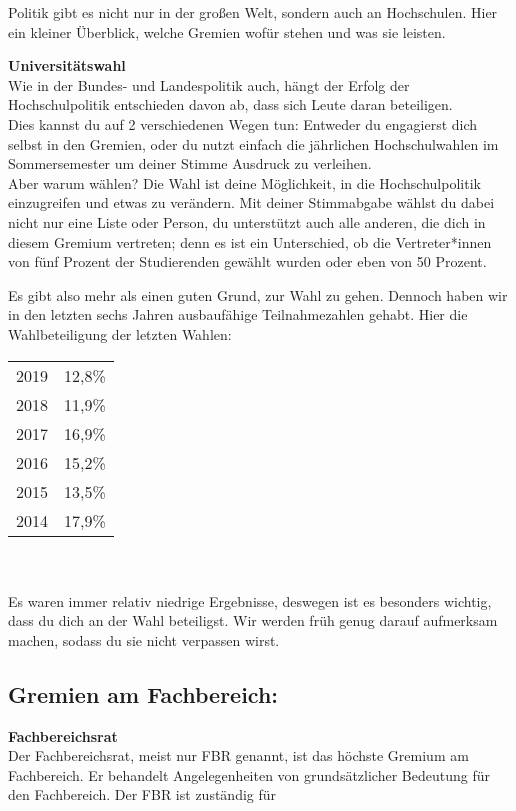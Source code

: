 {Politik gibt es nicht nur in der großen Welt, sondern auch an Hochschulen. Hier ein kleiner Überblick, welche Gremien wofür stehen und was sie leisten.
}{
    \noindent\textbf{Universitätswahl}\\
    Wie in der Bundes- und Landespolitik auch, hängt der Erfolg der Hochschulpolitik entschieden davon ab, dass sich Leute daran beteiligen.\\
    Dies kannst du auf 2 verschiedenen Wegen tun: Entweder du engagierst dich selbst in den Gremien, oder du nutzt einfach die jährlichen Hochschulwahlen im Sommersemester um deiner Stimme Ausdruck zu verleihen.\\
    Aber warum wählen? Die Wahl ist deine Möglichkeit, in die Hochschulpolitik einzugreifen und etwas zu verändern. Mit deiner Stimmabgabe wählst du dabei nicht nur eine Liste oder Person, du unterstützt auch alle anderen, die dich in diesem Gremium vertreten; denn es ist ein Unterschied, ob die Vertreter*innen von fünf Prozent der Studierenden gewählt wurden oder eben von 50 Prozent.

    Es gibt also mehr als einen guten Grund, zur Wahl zu gehen. Dennoch haben wir in den letzten sechs Jahren ausbaufähige Teilnahmezahlen gehabt. Hier die Wahlbeteiligung der letzten Wahlen:\\

    \begin{tabular}{ll}
        2019 & 12,8\% \\
        2018 & 11,9\% \\
        2017 & 16,9\% \\
        2016 & 15,2\% \\
        2015 & 13,5\% \\
        2014 & 17,9\% \\
    \end{tabular}
    \\\\
    Es waren immer relativ niedrige Ergebnisse, deswegen ist es besonders wichtig, dass du dich an der Wahl beteiligst. Wir werden früh genug darauf aufmerksam machen, sodass du sie nicht verpassen wirst.

    \noindent
    \subsection*{Gremien am Fachbereich:}
    \textbf{Fachbereichsrat}\\
    Der Fachbereichsrat, meist nur FBR genannt, ist das höchste Gremium am Fachbereich. Er behandelt Angelegenheiten von grundsätzlicher Bedeutung für den Fachbereich. Der FBR ist zuständig für

}
